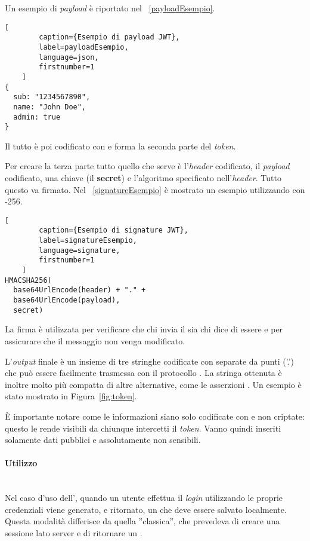 Un esempio di \textit{payload} è riportato nel \lstlistingname~\ref{payloadEsempio}.
\begin{lstlisting}[
		caption={Esempio di payload JWT},
		label=payloadEsempio,
		language=json,
		firstnumber=1
	]
{
  sub: "1234567890",
  name: "John Doe",
  admin: true
}
\end{lstlisting}
Il tutto è poi codificato con  e forma la seconda parte del \textit{token}.

Per creare la terza parte tutto quello che serve è l'\textit{header} codificato, il \textit{payload} codificato, una chiave (il \textbf{secret}) e l'algoritmo specificato nell'\textit{header}. Tutto questo va firmato. Nel \lstlistingname~\ref{signatureEsempio} è mostrato un esempio utilizzando  con -256.
\begin{lstlisting}[
		caption={Esempio di signature JWT},
		label=signatureEsempio,
		language=signature,
		firstnumber=1
	]
HMACSHA256(
  base64UrlEncode(header) + "." +
  base64UrlEncode(payload),
  secret)
\end{lstlisting}
La firma è utilizzata per verificare che chi invia il  sia chi dice di essere e per assicurare che il messaggio non venga modificato.

L'\textit{output} finale è un insieme di tre stringhe codificate con  separate da punti ('.') che può essere facilmente trasmessa con il protocollo . La stringa ottenuta è inoltre molto più compatta di altre alternative, come le asserzioni . Un esempio è stato mostrato in Figura~\ref{fig:token}.

È importante notare come le informazioni siano solo codificate con  e non criptate: questo le rende visibili da chiunque intercetti il \textit{token}. Vanno quindi inseriti solamente dati pubblici e assolutamente non sensibili.

\paragraph{Utilizzo} \mbox{} \\
Nel caso d'uso dell', quando un utente effettua il \textit{login} utilizzando le proprie credenziali viene generato, e ritornato, un  che deve essere salvato localmente. Questa modalità differisce da quella ''classica'', che prevedeva di creare una sessione lato server e di ritornare un .


